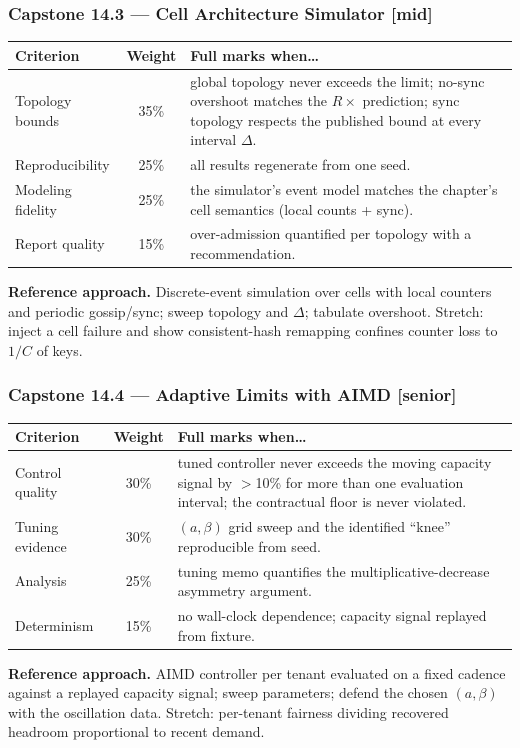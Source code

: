 \subsubsection*{Capstone 14.3 --- Cell Architecture Simulator [mid]}
\begin{center}\small
\begin{tabularx}{\textwidth}{l c X}
\toprule
\textbf{Criterion} & \textbf{Weight} & \textbf{Full marks when\ldots} \\
\midrule
Topology bounds & 35\% & global topology never exceeds the limit; no-sync overshoot matches the $R \times$ prediction; sync topology respects the published bound at every interval $\Delta$. \\
Reproducibility & 25\% & all results regenerate from one seed. \\
Modeling fidelity & 25\% & the simulator's event model matches the chapter's cell semantics (local counts + sync). \\
Report quality & 15\% & over-admission quantified per topology with a recommendation. \\
\bottomrule
\end{tabularx}
\end{center}
\textbf{Reference approach.} Discrete-event simulation over cells with
local counters and periodic gossip/sync; sweep topology and $\Delta$;
tabulate overshoot. Stretch: inject a cell failure and show consistent-hash
remapping confines counter loss to $1/C$ of keys.

\subsubsection*{Capstone 14.4 --- Adaptive Limits with AIMD [senior]}
\begin{center}\small
\begin{tabularx}{\textwidth}{l c X}
\toprule
\textbf{Criterion} & \textbf{Weight} & \textbf{Full marks when\ldots} \\
\midrule
Control quality & 30\% & tuned controller never exceeds the moving capacity signal by $>$10\% for more than one evaluation interval; the contractual floor is never violated. \\
Tuning evidence & 30\% & $(a, \beta)$ grid sweep and the identified ``knee'' reproducible from seed. \\
Analysis & 25\% & tuning memo quantifies the multiplicative-decrease asymmetry argument. \\
Determinism & 15\% & no wall-clock dependence; capacity signal replayed from fixture. \\
\bottomrule
\end{tabularx}
\end{center}
\textbf{Reference approach.} AIMD controller per tenant evaluated on a
fixed cadence against a replayed capacity signal; sweep parameters; defend
the chosen $(a,\beta)$ with the oscillation data. Stretch: per-tenant
fairness dividing recovered headroom proportional to recent demand.

